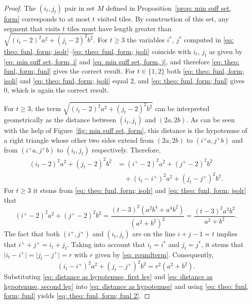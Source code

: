 \documentclass[12pt, a4paper]{article}
\newcommand{\tiles}{t} %
\newcommand{\isolr}{i^+}
\newcommand{\jsolr}{j^+}
\newcommand{\isoli}{i^\ast}
\newcommand{\jsoli}{j^\ast}
\newcommand{\roundterm}{r}
\newcommand{\mss}{M}
\begin{document}
\begin{proof}
The $(i_\tiles,j_\tiles)$ pair in set $\mss$ defined in Proposition~\ref{prop: min suff set, form} corresponds to at most $\tiles$ visited tiles. By construction of this set, any segment that visits $\tiles$ tiles must have length greater than $\sqrt{(i_\tiles-2)^2a^2 + (j_\tiles-2)^2b^2}$. For $\tiles \geq 3$ the variables $\isoli$, $\jsoli$ computed in \eqref{eq: theo: funl, form; isolr}--\eqref{eq: theo: funl, form; jsoli}
coincide with $i_\tiles$, $j_\tiles$ as given by \eqref{eq: min suff set, form, i} and \eqref{eq: min suff set, form, j}, and therefore \eqref{eq: theo: funl, form; funl} gives the correct result. For $\tiles \in \{1, 2\}$ both \eqref{eq: theo: funl, form; isoli} and \eqref{eq: theo: funl, form; jsoli} equal $2$, and \eqref{eq: theo: funl, form; funl} gives $0$, which is again the correct result.

For $\tiles \geq 3$, the term $\sqrt{(i_\tiles-2)^2a^2 + (j_\tiles-2)^2b^2}$ can be interpreted geometrically as the distance between $(i_\tiles, j_\tiles)$ and $(2a, 2b)$. As can be seen with the help of Figure~\ref{fig: min suff set, form}, this distance is the hypotenuse of a right triangle whose other two sides extend from $(2a, 2b)$ to $(\isolr a, \jsolr b)$ and from $(\isolr a, \jsolr b)$ to $(i_\tiles, j_\tiles)$ respectively. Therefore,
\begin{equation}
\label{eq: distance as hypotenuse}
\begin{split}
(i_\tiles-2)^2a^2 + (j_\tiles-2)^2b^2 &= (\isolr-2)^2a^2 + (\jsolr-2)^2b^2 \\
&\quad + (i_\tiles-\isolr)^2a^2 + (j_\tiles-\jsolr)^2b^2.
\end{split}
\end{equation}
For $\tiles \geq 3$ it stems from \eqref{eq: theo: funl, form; isolr}
and \eqref{eq: theo: funl, form; jsolr} that
\begin{equation}
\label{eq: distance as hypotenuse, first leg}
(\isolr-2)^2a^2 + (\jsolr-2)^2b^2 =
\frac{(\tiles-3)^2 (a^2b^4+a^4b^2)}{(a^2+b^2)^2} =
\frac{(\tiles-3)^2 a^2b^2}{a^2+b^2}.
\end{equation}
The fact that both $(\isolr, \jsolr)$ and $(i_\tiles, j_\tiles)$ are on the line $i+j-1=\tiles$ implies that $\isolr+\jsolr = i_\tiles+ j_\tiles$. Taking into account that $i_\tiles=\isoli$ and $j_\tiles=\jsoli$, it stems that $\vert i_\tiles-\isolr \vert = \vert j_\tiles-\jsolr \vert = \roundterm$ with $\roundterm$ given by \eqref{eq: roundterm}. Consequently,
\begin{equation}
\label{eq: distance as hypotenuse, second leg}
(i_\tiles-\isolr)^2a^2 + (j_\tiles-\jsolr)^2b^2 = \roundterm^2 (a^2+b^2).
\end{equation}
Substituting \eqref{eq: distance as hypotenuse, first leg} and \eqref{eq: distance as hypotenuse, second leg} into \eqref{eq: distance as hypotenuse} and using \eqref{eq: theo: funl, form; funl} yields \eqref{eq: theo: funl, form; funl 2}.


\end{proof}
\end{document}
